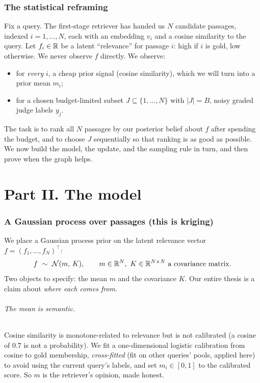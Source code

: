 \documentclass[11pt]{article}
\theoremstyle{plain}
\theoremstyle{definition}
\theoremstyle{remark}
\begin{document}
\section{The statistical reframing}\label{sec:reframe}
Fix a query. The first-stage retriever has handed us $N$ candidate passages, indexed $i=1,\dots,N$, each with an
embedding $v_i$ and a cosine similarity to the query. Let $f_i\in\mathbb{R}$ be a latent ``relevance'' for passage $i$: high
if $i$ is gold, low otherwise. We never observe $f$ directly. We observe:
\begin{itemize}[topsep=2pt,itemsep=1pt]
\item for \emph{every} $i$, a cheap prior signal (cosine similarity), which we will turn into a prior mean $m_i$;
\item for a chosen budget-limited subset $J\subseteq\{1,\dots,N\}$ with $|J|=B$, noisy graded judge labels $y_j$.
\end{itemize}
The task is to rank all $N$ passages by our posterior belief about $f$ after spending the budget, and to choose $J$
sequentially so that ranking is as good as possible. We now build the model, the update, and the sampling rule in
turn, and then prove when the graph helps.

\part*{Part II. The model}

\section{A Gaussian process over passages (this is kriging)}\label{sec:gp}
We place a Gaussian process prior on the latent relevance vector $f=(f_1,\dots,f_N)^\top$:
\begin{equation}
f\ \sim\ \N(m,\,K),\qquad m\in\R^N,\ K\in\R^{N\times N}\ \text{a covariance matrix.}
\label{eq:prior}
\end{equation}
Two objects to specify: the mean $m$ and the covariance $K$. Our entire thesis is a claim about \emph{where each
comes from}.

\paragraph{The mean is semantic.} Cosine similarity is monotone-related to relevance but is not calibrated (a cosine
of $0.7$ is not a probability). We fit a one-dimensional logistic calibration from cosine to gold membership,
\emph{cross-fitted} (fit on other queries' pools, applied here) to avoid using the current query's labels, and set
$m_i\in[0,1]$ to the calibrated score. So $m$ is the retriever's opinion, made honest.
\end{document}
